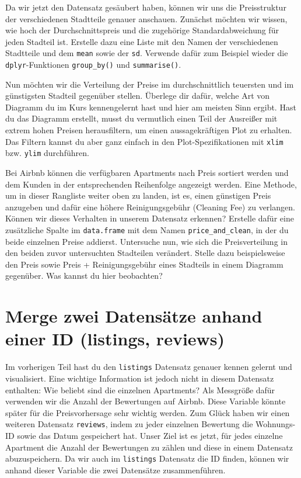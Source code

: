 \documentclass[
]{book}
\begin{document}
Da wir jetzt den Datensatz gesäubert haben, können wir uns die Preisstruktur der verschiedenen Stadtteile genauer anschauen.
Zunächst möchten wir wissen, wie hoch der Durchschnittspreis und die zugehörige Standardabweichung für jeden Stadteil ist.
Erstelle dazu eine Liste mit den Namen der verschiedenen Stadtteile und dem \texttt{mean} sowie der \texttt{sd}.
Verwende dafür zum Beispiel wieder die \texttt{dplyr}-Funktionen \texttt{group\_by()} und \texttt{summarise()}.

Nun möchten wir die Verteilung der Preise im durchschnittlich teuersten und im günstigsten Stadteil gegenüber stellen.
Überlege dir dafür, welche Art von Diagramm du im Kurs kennengelernt hast und hier am meisten Sinn ergibt.
Hast du das Diagramm erstellt, musst du vermutlich einen Teil der Ausreißer mit extrem hohen Preisen herausfiltern, um einen aussagekräftigen Plot zu erhalten. Das Filtern kannst du aber ganz einfach in den Plot-Spezifikationen mit \texttt{xlim} bzw. \texttt{ylim} durchführen.

Bei Airbnb können die verfügbaren Apartments nach Preis sortiert werden und dem Kunden in der entsprechenden Reihenfolge angezeigt werden.
Eine Methode, um in dieser Rangliste weiter oben zu landen, ist es, einen günstigen Preis anzugeben und dafür eine höhere Reinigungsgebühr (Cleaning Fee) zu verlangen.
Können wir dieses Verhalten in unserem Datensatz erkennen?
Erstelle dafür eine zusätzliche Spalte im \texttt{data.frame} mit dem Namen \texttt{price\_and\_clean}, in der du beide einzelnen Preise addierst.
Untersuche nun, wie sich die Preisverteilung in den beiden zuvor untersuchten Stadteilen verändert.
Stelle dazu beispielsweise den Preis sowie Preis + Reinigungsgebühr eines Stadteils in einem Diagramm gegenüber.
Was kannst du hier beobachten?

\hypertarget{merge-zwei-datensuxe4tze-anhand-einer-id-listings-reviews}{%
\section{Merge zwei Datensätze anhand einer ID (listings, reviews)}\label{merge-zwei-datensuxe4tze-anhand-einer-id-listings-reviews}}

Im vorherigen Teil hast du den \texttt{listings} Datensatz genauer kennen gelernt und visualisiert.
Eine wichtige Information ist jedoch nicht in diesem Datensatz enthalten: Wie beliebt sind die einzelnen Apartments?
Als Messgröße dafür verwenden wir die Anzahl der Bewertungen auf Airbnb.
Diese Variable könnte später für die Preisvorhersage sehr wichtig werden.
Zum Glück haben wir einen weiteren Datensatz \texttt{reviews}, indem zu jeder einzelnen Bewertung die Wohnungs-ID sowie das Datum gespeichert hat.
Unser Ziel ist es jetzt, für jedes einzelne Apartment die Anzahl der Bewertungen zu zählen und diese in einem Datensatz abuzuspeichern.
Da wir auch im \texttt{listings} Datensatz die ID finden, können wir anhand dieser Variable die zwei Datensätze zusammenführen.
\end{document}
